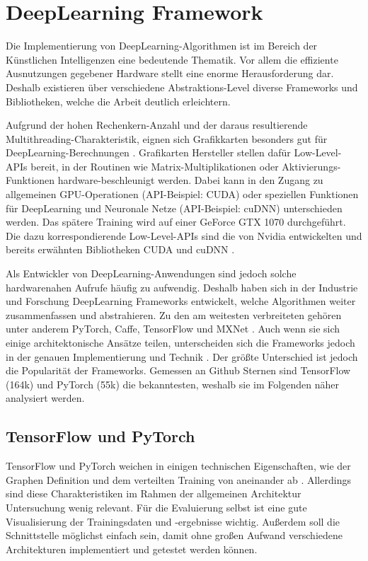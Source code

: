 \section{DeepLearning Framework}
Die Implementierung von DeepLearning-Algorithmen ist im Bereich der Künstlichen Intelligenzen eine bedeutende Thematik.
Vor allem die effiziente Ausnutzungen gegebener Hardware stellt eine enorme Herausforderung dar. 
Deshalb existieren über verschiedene Abstraktions-Level diverse Frameworks und Bibliotheken, welche die Arbeit deutlich erleichtern.
\newline

Aufgrund der hohen Rechenkern-Anzahl und der daraus resultierende Multithreading-Charakteristik, eignen sich Grafikkarten besonders gut für DeepLearning-Berechnungen \cite{gpu-for-dl}.
Grafikarten Hersteller stellen dafür Low-Level-APIs bereit, in der Routinen wie Matrix-Multiplikationen oder Aktivierungs-Funktionen hardware-beschleunigt werden.
Dabei kann in den Zugang zu allgemeinen GPU-Operationen (API-Beispiel: CUDA) oder speziellen Funktionen für DeepLearning und Neuronale Netze (API-Beispiel: cuDNN) unterschieden werden.
Das spätere Training wird auf einer GeForce GTX 1070 \cite{gtx-1070} durchgeführt.
Die dazu korrespondierende Low-Level-APIs sind die von Nvidia entwickelten und bereits erwähnten Bibliotheken CUDA \cite{cuda-doc} und cuDNN \cite{cudnn-doc}.  
\newline

Als Entwickler von DeepLearning-Anwendungen sind jedoch solche hardwarenahen Aufrufe häufig zu aufwendig.
Deshalb haben sich in der Industrie und Forschung DeepLearning Frameworks entwickelt, welche Algorithmen weiter zusammenfassen und abstrahieren.
Zu den am weitesten verbreiteten gehören unter anderem PyTorch, Caffe, TensorFlow und MXNet \cite[S. 2018]{dl-framework-evaluation}. 
Auch wenn sie sich einige architektonische Ansätze teilen, unterscheiden sich die Frameworks jedoch in der genauen Implementierung und Technik \cite[S. 2018, 2020]{dl-framework-evaluation}.
Der größte Unterschied ist jedoch die Popularität der Frameworks.
Gemessen an Github Sternen sind TensorFlow (164k) \cite{github-tensorflow} und PyTorch (55k) \cite{github-pytorch} die bekanntesten, weshalb sie im Folgenden näher analysiert werden.
 
\subsection{TensorFlow und PyTorch}
TensorFlow und PyTorch weichen in einigen technischen Eigenschaften, wie der Graphen Definition und dem verteilten Training von aneinander ab \cite{pytorch-vs-tensorflow}.
Allerdings sind diese Charakteristiken im Rahmen der allgemeinen Architektur Untersuchung wenig relevant.
Für die Evaluierung selbst ist eine gute Visualisierung der Trainingsdaten und -ergebnisse wichtig.
Außerdem soll die Schnittstelle möglichst einfach sein, damit ohne großen Aufwand verschiedene Architekturen implementiert und getestet werden können.

